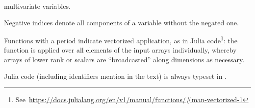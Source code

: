\begin{description}[style=nextline, leftmargin=4cm]
  multivariate variables.
\item[{\(z_{-i} = [z_{1}, \ldots, z_{i-1}, z_{i+1}, \ldots, z_{N}]\)}] Negative indices denote all
  components of a variable without the negated one.
\item[{\(\broadcast{f}(x, 1) = [f(x_{1}, 1), \ldots, f(x_{N}, 1)]\)}] Functions with a period
  indicate vectorized application, as in Julia
  code\footnote{See~\protect\url{https://docs.julialang.org/en/v1/manual/functions/\#man-vectorized-1}}:
  the function is applied over all elements of the input arrays individually, whereby arrays of
  lower rank or scalars are \enquote{broadcasted} along dimensions as necessary.
\item[Julia code] Julia code (including identifiers mention in the text) is always typeset in
  .
\end{description}

